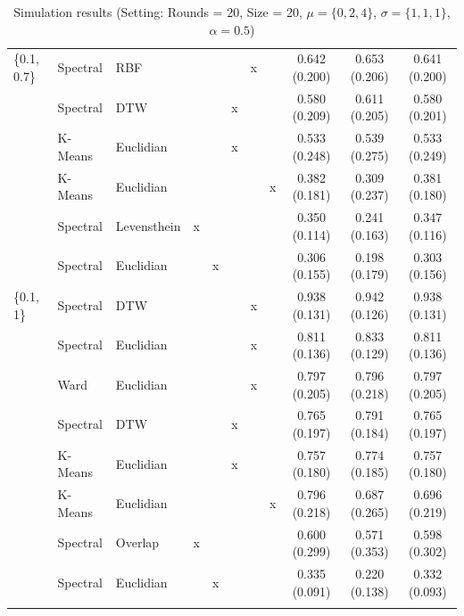 \documentclass[12pt,a4paper,bibliography=totocnumbered,listof=totocnumbered]{scrartcl}
\begin{document}
\begin{appendix}
\begin{table}[!htbp]
\begin{tabularx}{\textwidth}{ lllcccccccc}
		\{0.1, 0.7\} & Spectral & RBF &  &  &  & x &  & 0.642 (0.200) & 0.653 (0.206) & 0.641 (0.200) \\ 
		& Spectral & DTW &  &  & x &  &  & 0.580 (0.209) & 0.611 (0.205) & 0.580 (0.201) \\ 
		& K-Means & Euclidian &  &  & x &  &  & 0.533 (0.248) & 0.539 (0.275) & 0.533 (0.249) \\ 
		& K-Means & Euclidian &  &  &  &  & x & 0.382 (0.181) & 0.309 (0.237) & 0.381 (0.180) \\ 
		& Spectral & Levensthein & x &  &  &  &  & 0.350 (0.114) & 0.241 (0.163) & 0.347 (0.116) \\ 
		& Spectral & Euclidian &  & x &  &  &  & 0.306 (0.155) & 0.198 (0.179) & 0.303 (0.156) \\ 
		\{0.1, 1\} & Spectral & DTW &  &  &  & x &  & 0.938 (0.131) & 0.942 (0.126) & 0.938 (0.131) \\ 
		& Spectral & Euclidian &  &  &  & x &  & 0.811 (0.136) & 0.833 (0.129) & 0.811 (0.136) \\ 
		& Ward  & Euclidian &  &  &  & x &  & 0.797 (0.205) & 0.796 (0.218) & 0.797 (0.205) \\ 
		& Spectral & DTW &  &  & x &  &  & 0.765 (0.197) & 0.791 (0.184) & 0.765 (0.197) \\ 
		& K-Means & Euclidian &  &  & x &  &  & 0.757 (0.180) & 0.774 (0.185) & 0.757 (0.180) \\ 
		& K-Means & Euclidian &  &  &  &  & x & 0.796 (0.218) & 0.687 (0.265) & 0.696 (0.219) \\ 
		& Spectral & Overlap & x &  &  &  &  & 0.600 (0.299) & 0.571 (0.353) & 0.598 (0.302) \\ 
		& Spectral & Euclidian &  & x &  &  &  & 0.335 (0.091) & 0.220 (0.138) & 0.332 (0.093) \\ 
		\hline \\[-1.8ex] 
		\end{tabularx} 
			\caption{Simulation results (Setting: Rounds = 20, Size = 20, $\mu = \{0,2,4\}$, $\sigma =  \{1,1,1\}$, $\alpha = 0.5$)} 
			
		\end{table}
	



\end{appendix}
\end{document}
